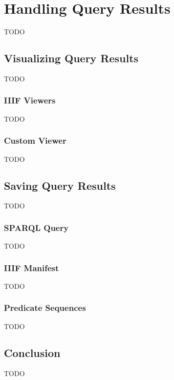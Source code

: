 \chapter{Handling Query Results}
\label{chap:handling_query_results}

TODO

\section{Visualizing Query Results}
\label{sec:visualizing_query_results}

TODO

\subsection{IIIF Viewers}

TODO


\subsection{Custom Viewer}

TODO

\section{Saving Query Results}
\label{sec:saving_query_results}

TODO

\subsection{SPARQL Query}

TODO

\subsection{IIIF Manifest}

TODO

\subsection{Predicate Sequences}

TODO

\section{Conclusion}

TODO